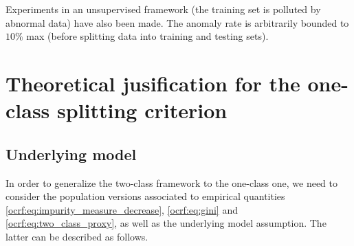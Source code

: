 Experiments in an unsupervised framework (the training set is polluted by
abnormal data) have also been made. %
The anomaly rate is arbitrarily bounded to $10\%$ max (before splitting data into training and testing sets).


\section{Theoretical jusification for the one-class splitting criterion}
\label{sec:ocrf:theory}
\subsection{Underlying model}
\label{ocrf:sec:model}
In order to generalize the two-class framework to the one-class one, we need to consider the population versions associated to empirical quantities \eqref{ocrf:eq:impurity_measure_decrease}, \eqref{ocrf:eq:gini} and \eqref{ocrf:eq:two_class_proxy}, as well as the underlying model assumption. The latter can be described as follows.

